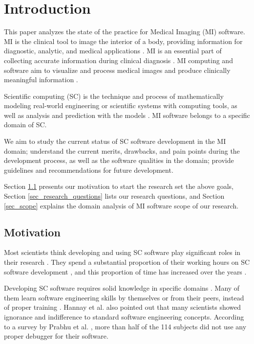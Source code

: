 \chapter{Introduction}
\label{ch_intro}
This paper analyzes the state of the practice for Medical Imaging (MI) software. MI is the clinical tool to image the interior of a body, providing information for diagnostic, analytic, and medical applications \cite{FDA2021} \cite{enwiki:1034887445}. MI is an essential part of collecting accurate information during clinical diagnosis \cite{Zhang2008}. MI computing and software aim to visualize and process medical images and produce clinically meaningful information \cite{enwiki:1034877594}.

Scientiﬁc computing (SC) is the technique and process of mathematically modeling real-world engineering or scientific systems with computing tools, as well as analysis and prediction with the models \cite{Smith2006}. MI software belongs to a specific domain of SC.

We aim to study the current status of SC software development in the MI domain; understand the current merits, drawbacks, and pain points during the development process, as well as the software qualities in the domain; provide guidelines and recommendations for future development.

Section \ref{sec_motivation} presents our motivation to start the research set the above goals, Section \ref{sec_research_questions} lists our research questions, and Section \ref{sec_scope} explains the domain analysis of MI software scope of our research.

\section{Motivation}
\label{sec_motivation}
Most scientists think developing and using SC software play significant roles in their research \cite{Hannay2009}. They spend a substantial proportion of their working hours on SC software development \cite{Hannay2009} \cite{Prabhu2011}, and this proportion of time has increased over the years \cite{Hannay2009}. 

Developing SC software requires solid knowledge in specific domains \cite{Wilson2014}. Many of them learn software engineering skills by themselves or from their peers, instead of proper training \cite{Hannay2009}. Hannay et al. \cite{Hannay2009} also pointed out that many scientists showed ignorance and indifference to standard software engineering concepts. According to a survey by Prabhu et al. \cite{Prabhu2011}, more than half of the 114 subjects did not use any proper debugger for their software.

